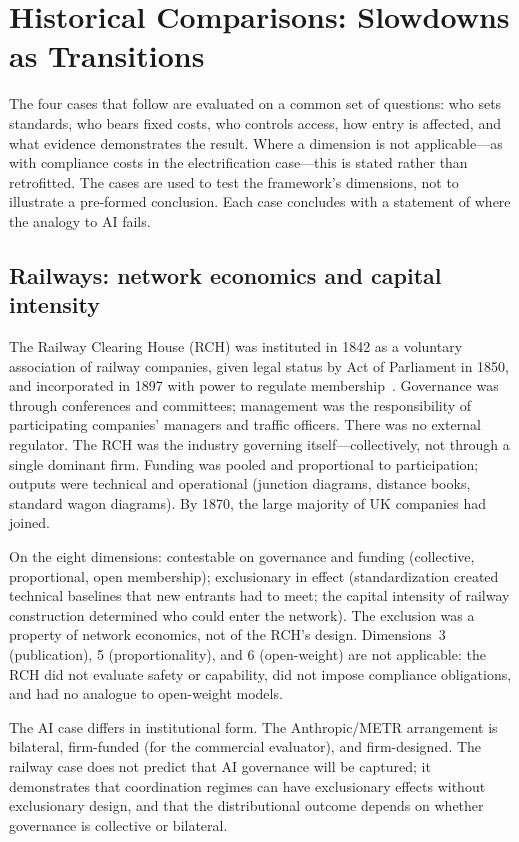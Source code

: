 \section{Historical Comparisons: Slowdowns as Transitions}

The four cases that follow are evaluated on a common set of questions: who sets standards, who bears fixed costs, who controls access, how entry is affected, and what evidence demonstrates the result. Where a dimension is not applicable---as with compliance costs in the electrification case---this is stated rather than retrofitted. The cases are used to test the framework's dimensions, not to illustrate a pre-formed conclusion. Each case concludes with a statement of where the analogy to AI fails.

\subsection{Railways: network economics and capital intensity}

The Railway Clearing House (RCH) was instituted in 1842 as a voluntary association of railway companies, given legal status by Act of Parliament in 1850, and incorporated in 1897 with power to regulate membership~\cite{bagwell1974}. Governance was through conferences and committees; management was the responsibility of participating companies' managers and traffic officers. There was no external regulator. The RCH was the industry governing itself---collectively, not through a single dominant firm. Funding was pooled and proportional to participation; outputs were technical and operational (junction diagrams, distance books, standard wagon diagrams). By 1870, the large majority of UK companies had joined.

On the eight dimensions: contestable on governance and funding (collective, proportional, open membership); exclusionary in effect (standardization created technical baselines that new entrants had to meet; the capital intensity of railway construction determined who could enter the network). The exclusion was a property of network economics, not of the RCH's design. Dimensions~3 (publication), 5 (proportionality), and 6 (open-weight) are not applicable: the RCH did not evaluate safety or capability, did not impose compliance obligations, and had no analogue to open-weight models.

The AI case differs in institutional form. The Anthropic/METR arrangement is bilateral, firm-funded (for the commercial evaluator), and firm-designed. The railway case does not predict that AI governance will be captured; it demonstrates that coordination regimes can have exclusionary effects without exclusionary design, and that the distributional outcome depends on whether governance is collective or bilateral.

